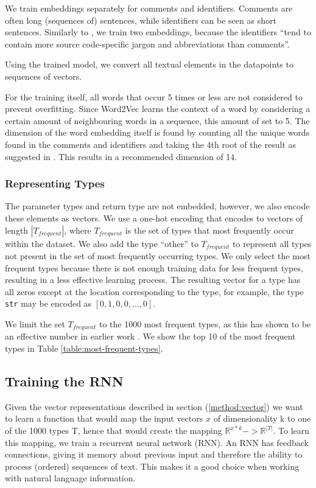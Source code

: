 We train embeddings separately for comments and identifiers. Comments are often long (sequences of) sentences, while identifiers can be seen as short sentences. Similarly to \cite{Malik2019NL2Type:Information}, we train two embeddings, because the identifiers ``tend to contain more source code-specific jargon and abbreviations than comments''.

\begin{notsw}
Using the trained model, we convert all textual elements in the datapoints to sequences of vectors.

For the training itself, all words that occur 5 times or less are not considered to prevent overfitting. Since Word2Vec learns the context of a word by considering a certain amount of neighbouring words in a sequence, this amount of set to 5.
The dimension of the word embedding itself is found by counting all the unique words found in the comments and identifiers and taking the 4th root of the result as suggested in \cite{TensorFlowTeam2017IntroducingColumnss}. This results in a recommended dimension of 14.
\end{notsw}


\subsubsection{Representing Types}\label{method:vector:types}
The parameter types and return type are not embedded, however, we also encode these elements as vectors. We use a one-hot encoding \cite{Neter1996AppliedModels} that encodes to vectors of length $|T_{frequent}|$, where $T_{frequent}$ is the set of types that most frequently occur within the dataset. We also add the type ``other'' to $T_{frequent}$ to represent all types not present in the set of most frequently occurring types. We only select the most frequent types because there is not enough training data for less frequent types, resulting in a less effective learning process. The resulting vector for a type has all zeros except at the location corresponding to the type, for example, the type \texttt{str} may be encoded as $[0, 1, 0, 0, ..., 0]$.

We limit the set $T_{frequent}$ to the 1000 most frequent types, as this has shown to be an effective number in earlier work \cite{Malik2019NL2Type:Information}. We show the top 10 of the most frequent types in Table \ref{table:most-frequent-types}.



\subsection{Training the RNN} \label{method:lstm}
Given the vector representations described in section (\ref{method:vector}) we want to learn a function that would map the input vectors $x$ of dimensionality k to one of the 1000 types T, hence that would create the mapping $\mathbb{R}^{x*k}->\mathbb{R}^{|T|}$. To learn this mapping, we train a recurrent neural network (RNN). An RNN has feedback connections, giving it memory about previous input and therefore the ability to process (ordered) sequences of text. This makes it a good choice when working with natural language information.

